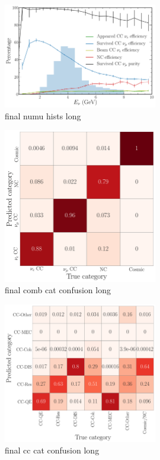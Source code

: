 \begin{figure} %
    \includegraphics[width=0.6\textwidth]{diagrams/6-cvn/chipsnet/final_numu_hists.pdf}
    \caption[final numu hists short]
    {final numu hists long}
    \label{fig:final_numu_hists}
\end{figure}

\begin{figure} %
    \includegraphics[width=0.6\textwidth]{diagrams/6-cvn/chipsnet/final_comb_cat_confusion.pdf}
    \caption[final comb cat confusion short]
    {final comb cat confusion long}
    \label{fig:final_comb_cat_confusion}
\end{figure}

\begin{figure} %
    \includegraphics[width=0.6\textwidth]{diagrams/6-cvn/chipsnet/final_cc_cat_confusion.pdf}
    \caption[final cc cat confusion short]
    {final cc cat confusion long}
    \label{fig:final_cc_cat_confusion}
\end{figure}

